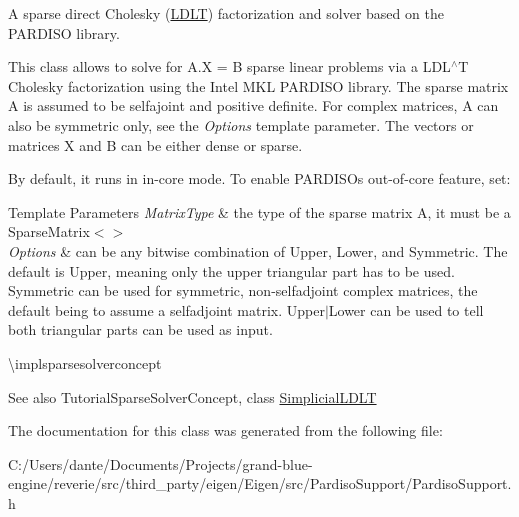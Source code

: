 A sparse direct Cholesky (\mbox{\hyperlink{class_eigen_1_1_l_d_l_t}{L\+D\+LT}}) factorization and solver based on the P\+A\+R\+D\+I\+SO library. 

This class allows to solve for A.\+X = B sparse linear problems via a L\+D\+L$^\wedge$T Cholesky factorization using the Intel M\+KL P\+A\+R\+D\+I\+SO library. The sparse matrix A is assumed to be selfajoint and positive definite. For complex matrices, A can also be symmetric only, see the {\itshape Options} template parameter. The vectors or matrices X and B can be either dense or sparse.

By default, it runs in in-\/core mode. To enable P\+A\+R\+D\+I\+SO\textquotesingle{}s out-\/of-\/core feature, set\+: 
\begin{DoxyCode}{0}
\end{DoxyCode}



\begin{DoxyTemplParams}{Template Parameters}
{\em Matrix\+Type} & the type of the sparse matrix A, it must be a Sparse\+Matrix$<$$>$ \\
\hline
{\em Options} & can be any bitwise combination of Upper, Lower, and Symmetric. The default is Upper, meaning only the upper triangular part has to be used. Symmetric can be used for symmetric, non-\/selfadjoint complex matrices, the default being to assume a selfadjoint matrix. Upper$\vert$\+Lower can be used to tell both triangular parts can be used as input.\\
\hline
\end{DoxyTemplParams}
\textbackslash{}implsparsesolverconcept

\begin{DoxySeeAlso}{See also}
Tutorial\+Sparse\+Solver\+Concept, class \mbox{\hyperlink{class_eigen_1_1_simplicial_l_d_l_t}{Simplicial\+L\+D\+LT}} 
\end{DoxySeeAlso}


The documentation for this class was generated from the following file\+:\begin{DoxyCompactItemize}
\item 
C\+:/\+Users/dante/\+Documents/\+Projects/grand-\/blue-\/engine/reverie/src/third\+\_\+party/eigen/\+Eigen/src/\+Pardiso\+Support/Pardiso\+Support.\+h\end{DoxyCompactItemize}
